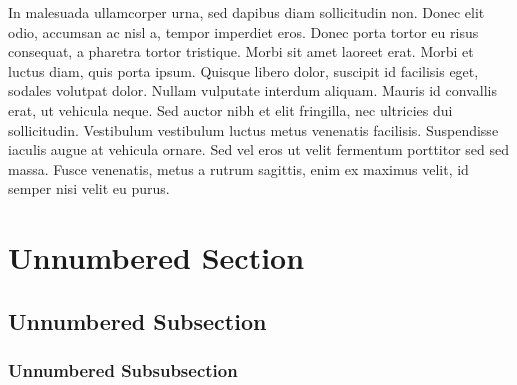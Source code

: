 In malesuada ullamcorper urna, sed dapibus diam sollicitudin non. Donec elit odio, accumsan ac nisl a, tempor imperdiet eros. Donec porta tortor eu risus consequat, a pharetra tortor tristique. Morbi sit amet laoreet erat. Morbi et luctus diam, quis porta ipsum. Quisque libero dolor, suscipit id facilisis eget, sodales volutpat dolor. Nullam vulputate interdum aliquam. Mauris id convallis erat, ut vehicula neque. Sed auctor nibh et elit fringilla, nec ultricies dui sollicitudin. Vestibulum vestibulum luctus metus venenatis facilisis. Suspendisse iaculis augue at vehicula ornare. Sed vel eros ut velit fermentum porttitor sed sed massa. Fusce venenatis, metus a rutrum sagittis, enim ex maximus velit, id semper nisi velit eu purus.


\section*{Unnumbered Section}

\subsection*{Unnumbered Subsection}

\subsubsection*{Unnumbered Subsubsection}


